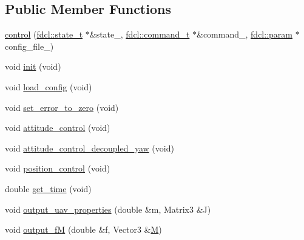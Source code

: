 \subsection*{Public Member Functions}
\begin{DoxyCompactItemize}
\item 
\hyperlink{classfdcl_1_1control_ab3bd5c178f3fd6d61bf0f29ad2fc339a}{control} (\hyperlink{structfdcl_1_1state__t}{fdcl\+::state\+\_\+t} $\ast$\&state\+\_\+, \hyperlink{classfdcl_1_1command__t}{fdcl\+::command\+\_\+t} $\ast$\&command\+\_\+, \hyperlink{classfdcl_1_1param}{fdcl\+::param} $\ast$config\+\_\+file\+\_\+)
\item 
void \hyperlink{classfdcl_1_1control_af34df47cf02b52fec6dfc2a4c7e5d371}{init} (void)
\item 
void \hyperlink{classfdcl_1_1control_ad3018fbc5248444a600eabe7f9e8da7d}{load\+\_\+config} (void)
\item 
void \hyperlink{classfdcl_1_1control_af1ddb6b0713fbef94fe71b48e03537bf}{set\+\_\+error\+\_\+to\+\_\+zero} (void)
\item 
void \hyperlink{classfdcl_1_1control_ad4ff4c4944a54ddd2300978cc24c0b3e}{attitude\+\_\+control} (void)
\item 
void \hyperlink{classfdcl_1_1control_a4f2e692c9094316f378a31e8eda35dd0}{attitude\+\_\+control\+\_\+decoupled\+\_\+yaw} (void)
\item 
void \hyperlink{classfdcl_1_1control_a7d2920ae66a3939cdf60ff433e4312b6}{position\+\_\+control} (void)
\item 
double \hyperlink{classfdcl_1_1control_ab88fc7a360808e8c7ee506b78f66ca4a}{get\+\_\+time} (void)
\item 
void \hyperlink{classfdcl_1_1control_a1adfef77a80a920babeaf9dd3ac53a0f}{output\+\_\+uav\+\_\+properties} (double \&m, Matrix3 \&J)
\item 
void \hyperlink{classfdcl_1_1control_a132aa3639cff3b5e2e20da91698216aa}{output\+\_\+fM} (double \&f, Vector3 \&\hyperlink{classfdcl_1_1control_afdd2524a3a5bb05b7235fdca829be124}{M})
\end{DoxyCompactItemize}
